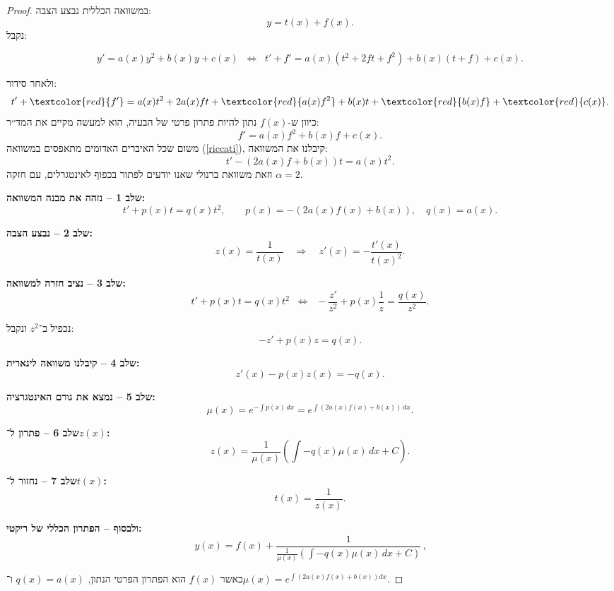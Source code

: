 \documentclass{article}
\numberwithin{equation}{section}
\begin{document}
\begin{proof} 
במשוואה הכללית נבצע הצבה:  
\[
y = t(x) + f(x).
\]
נקבל:

\[
y' = a(x)y^2 + b(x)y + c(x) 
\;\;\Longleftrightarrow\;\;
t' + f' = a(x)(t^2+2ft+f^2) + b(x)(t+f) + c(x).
\]

ולאחר סידור:  
\begin{equation}\label{riccati}
t' + \textcolor{red}{f'} = a(x)t^2 + 2a(x)ft + \textcolor{red}{a(x)f^2} + b(x)t + \textcolor{red}{b(x)f} + \textcolor{red}{c(x)}.
\end{equation}
כיוון ש-$f(x)$ נתון להיות פתרון פרטי של הבעיה, הוא למעשה מקיים את המד׳׳ר:
\[
f' = a(x)f^2 + b(x)f + c(x).
\]
משום שכל האיברים האדומים מתאפסים במשוואה (\ref{riccati}), קיבלנו את המשוואה:  
\[
t' - (2a(x)f+b(x))t = a(x)t^2.
\]
וזאת משוואת ברנולי שאנו יודעים לפתור בכפוף לאינטגרלים, עם חזקה $\alpha=2$.

\textbf{שלב 1 – נזהה את מבנה המשוואה:}
\[
t' + p(x)t = q(x) t^2, \qquad p(x) = -(2a(x)f(x)+b(x)), \quad q(x) = a(x).
\]

\textbf{שלב 2 – נבצע הצבה:}
\[
z(x) = \frac{1}{t(x)} \quad \Longrightarrow \quad z'(x) = -\frac{t'(x)}{t(x)^2}.
\]

\textbf{שלב 3 – נציב חזרה למשוואה:}
\[
t' + p(x)t = q(x)t^2 
\;\;\Longleftrightarrow\;\;
-\frac{z'}{z^2} + p(x)\frac{1}{z} = \frac{q(x)}{z^2}.
\]

נכפיל ב־$z^2$ ונקבל:
\[
-z' + p(x)z = q(x).
\]

\textbf{שלב 4 – קיבלנו משוואה לינארית:}
\[
z'(x) - p(x)z(x) = -q(x).
\]

\textbf{שלב 5 – נמצא את גורם האינטגרציה:}
\[
\mu(x) = e^{-\int p(x)\,dx} = e^{\int (2a(x)f(x)+b(x))\,dx}.
\]

\textbf{שלב 6 – פתרון ל־$z(x)$:}
\[
z(x) = \frac{1}{\mu(x)}\left(\int -q(x)\mu(x)\,dx + C\right).
\]

\textbf{שלב 7 – נחזור ל־$t(x)$:}
\[
t(x) = \frac{1}{z(x)}.
\]

\textbf{ולבסוף – הפתרון הכללי של ריקטי:}
\begin{equation}
\boxed{\,y(x) = f(x) + \frac{1}{\tfrac{1}{\mu(x)}\left(\int -q(x)\mu(x)\,dx + C\right)}\,},
\end{equation}

כאשר $f(x)$ הוא הפתרון הפרטי הנתון, $q(x)=a(x)$ ו־$\mu(x)=e^{\int (2a(x)f(x)+b(x))dx}$.

\end{proof} 
\end{document}
